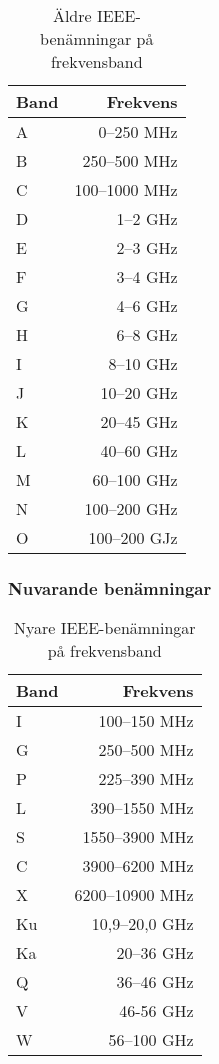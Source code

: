\begin{table}[H]
	\centering
	\begin{tabular}{lr}
		\textbf{Band} & \textbf{Frekvens} \\ \hline
		A             &        0--250 MHz \\
		B             &      250--500 MHz \\
		C             &     100--1000 MHz \\
		D             &          1--2 GHz \\
		E             &          2--3 GHz \\
		F             &          3--4 GHz \\
		G             &          4--6 GHz \\
		H             &          6--8 GHz \\
		I             &         8--10 GHz \\
		J             &        10--20 GHz \\
		K             &        20--45 GHz \\
		L             &        40--60 GHz \\
		M             &       60--100 GHz \\
		N             &      100--200 GHz \\
		O             &      100--200 GJz
	\end{tabular}
	\caption{Äldre IEEE-benämningar på frekvensband}
\end{table}

\subsubsection{Nuvarande benämningar}

\begin{table}[H]
	\centering
	\begin{tabular}{lr}
		\textbf{Band} & \textbf{Frekvens} \\ \hline
		I             &      100--150 MHz \\
		G             &      250--500 MHz \\
		P             &      225--390 MHz \\
		L             &     390--1550 MHz \\
		S             &    1550--3900 MHz \\
		C             &    3900--6200 MHz \\
		X             &   6200--10900 MHz \\
		Ku            &    10,9--20,0 GHz \\
		Ka            &        20--36 GHz \\
		Q             &        36--46 GHz \\
		V             &         46-56 GHz \\
		W             &       56--100 GHz
	\end{tabular}
	\caption{Nyare IEEE-benämningar på frekvensband}
\end{table}

